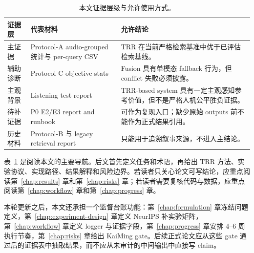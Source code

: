 \begin{table}[H]
	\centering
	\caption{本文证据层级与允许使用方式。}
	\label{tab:evidence-boundary-overview}
	\small
	\begin{tabularx}{\textwidth}{p{}p{}p{}}
		\toprule
			证据层 & 代表材料 & 允许结论 \\
		\midrule
		主证据 & Protocol-A audio-grouped 统计与 per-query CSV & TRR 在当前严格检索基准中优于已评估检索基线。 \\
		辅助诊断 & Protocol-C objective stats & Fusion 具有单模态 fallback 行为，但 conflict 失败必须披露。 \\
		主观背景 & Listening test report & TRR-based system 具有一定主观感知参考价值，但不是严格人机公平胜负证据。 \\
		待补证据 & P0 E2/E3 report and runbook & 可作为复现入口；缺少原始 outputs 前不能作为正式结果引用。 \\
		历史材料 & Protocol-B 与 legacy retrieval report & 只能用于追溯叙事来源，不进入主结论。 \\
		\bottomrule
	\end{tabularx}
\end{table}

表~\ref{tab:evidence-boundary-overview} 是阅读本文的主要导航。后文首先定义任务和术语，再给出 TRR 方法、实验协议、实现路径、结果解释和风险边界。若读者只关心论文可写结论，应重点阅读第~\ref{chap:results} 章和第~\ref{chap:risks} 章；若读者需要复核代码与数据，应重点阅读第~\ref{chap:workflow} 章和第~\ref{chap:progress} 章。

本轮更新之后，本文还承担一个监督台账功能：第~\ref{chap:formulation} 章冻结问题定义，第~\ref{chap:experiment-design} 章定义 NeurIPS 补实验矩阵，第~\ref{chap:workflow} 章定义 logger 与证据字段，第~\ref{chap:progress} 章安排 4--6 周执行节奏，第~\ref{chap:risks} 章给出 KaiMing gate。后续正式论文应从这些 gate 通过后的证据表中抽取结果，而不应从未审计的中间输出中直接写 claim。
